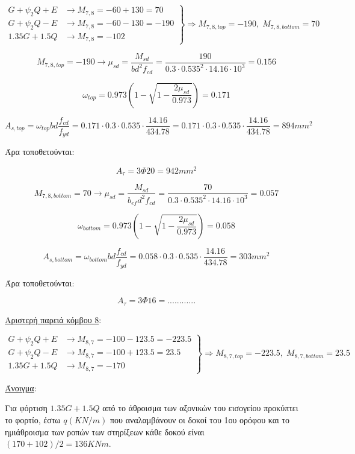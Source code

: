 \[
\left.
   \begin{array}{ll}
     G+\psi_2 Q + Ε & \rightarrow M_{7,8} = -60+130 = 70 \\
     G+\psi_2 Q - Ε & \rightarrow M_{7,8} = -60-130 = -190 \\
     1.35G + 1.5Q     & \rightarrow M_{7,8} = -102
   \end{array}
\right\} \Rightarrow M_{7,8,top} = -190,\; M_{7,8,bottom} = 70
\]

\[
M_{7,8,top} = -190 \rightarrow \mu_{sd} = \dfrac{M_{sd}}{b d^2 f_{cd}} = \dfrac{190}{0.3\cdot0.535^2\cdot14.16\cdot10^3} = 0.156
\]

\[
\omega_{top} = 0.973\left( 1 - \sqrt{1 - \dfrac{2\mu_{sd}}{0.973}} \right) = 0.171
\]

\[
A_{s,top} = \omega_{top}b d \dfrac{f_{cd}}{f_{yd}} = 0.171\cdot 0.3 \cdot 0.535 \cdot \dfrac{14.16}{434.78} = 0.171\cdot 0.3 \cdot 0.535 \cdot \dfrac{14.16}{434.78} = 894mm^2
\]

\noindent
Άρα τοποθετούνται:

\[
A_{\tau} = 3\Phi20 = 942mm^2
\]

\[
M_{7,8,bottom} = 70 \rightarrow \mu_{sd} = \dfrac{M_{sd}}{b_{ef} d^2 f_{cd}} = \dfrac{70}{0.3\cdot0.535^2\cdot14.16\cdot10^3} = 0.057
\]

\[
\omega_{bottom} = 0.973\left( 1 - \sqrt{1 - \dfrac{2\mu_{sd}}{0.973}} \right) = 0.058
\]

\[
A_{s,bottom} = \omega_{bottom}b d \dfrac{f_{cd}}{f_{yd}} = 0.058\cdot 0.3 \cdot 0.535 \cdot \dfrac{14.16}{434.78} = 303mm^2
\]

\noindent
Άρα τοποθετούνται:

\[
A_{\tau} = 3\Phi16 = ............
\]

\noindent
\underline{Αριστερή παρειά κόμβου 8}:

\[
\left.
   \begin{array}{ll}
       G+\psi_2 Q + Ε & \rightarrow M_{8,7} = -100-123.5 = -223.5 \\
       G+\psi_2 Q - Ε & \rightarrow M_{8,7} = -100+123.5 = 23.5 \\
       1.35G + 1.5Q     & \rightarrow M_{8,7} = -170
   \end{array}
\right \} \Rightarrow M_{8,7,top} = -223.5,\; M_{8,7,bottom} = 23.5
\]

\noindent
\underline{Άνοιγμα}:

\bigskip

\noindent
Για φόρτιση \(1.35G + 1.5Q\) από το άθροισμα των αξονικών του εισογείου προκύπτει το φορτίο, έστω $q (KN/m)$ που αναλαμβάνουν οι δοκοί του 1ου ορόφου και το ημιάθροισμα των ροπών των στηρίξεων κάθε δοκού είναι $(170+102)/2= 136KNm$.

